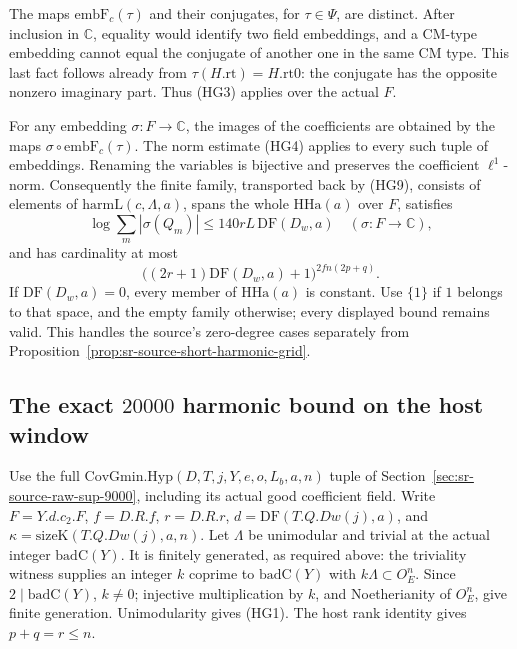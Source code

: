 The maps \(\mathrm{embF}_c(\tau)\) and their conjugates,
for \(\tau\in\Psi\), are distinct.
After inclusion in \(\mathbb C\), equality would
identify two field embeddings, and a CM-type
embedding cannot equal the conjugate of another
one in the same CM type.  This last fact follows
already from \(\tau(H.\mathrm{rt})=H.\mathrm{rt0}\):
the conjugate has the opposite nonzero imaginary
part.  Thus (HG3) applies over the actual \(F\).

For any embedding \(\sigma:F\to\mathbb C\),
the images of the coefficients are obtained by the
maps \(\sigma\circ\mathrm{embF}_c(\tau)\).
The norm estimate (HG4) applies to every such tuple
of embeddings.  Renaming the variables is bijective
and preserves the coefficient \(\ell^1\)-norm.
Consequently the finite family, transported back
by (HG9), consists of elements of
\(\mathrm{harmL}(c,\Lambda,a)\), spans the whole
\(\mathrm{HHa}(a)\) over \(F\), satisfies
\[
 \log\sum_m|\sigma(Q_m)|\le
          140rL\,\mathrm{DF}(D_w,a)\quad(\sigma:F\to\mathbb C),
 \tag{HG10}\label{eq:sr-source-harmL-all-embeddings}
\]
and has cardinality at most
\[
 \bigl((2r+1)\mathrm{DF}(D_w,a)+1\bigr)^{2fn(2p+q)}.
\]
If \(\mathrm{DF}(D_w,a)=0\), every member of
\(\mathrm{HHa}(a)\) is constant.
Use \(\{1\}\) if \(1\) belongs to that space, and the
empty family otherwise; every displayed bound remains
valid.  This handles the source's zero-degree cases
separately from Proposition~\ref{prop:sr-source-short-harmonic-grid}.

\subsection{The exact \(20000\) harmonic bound on the host window}
Use the full \(\mathrm{CovGmin.Hyp}(D,T,j,Y,e,o,L_b,a,n)\)
tuple of Section~\ref{sec:sr-source-raw-sup-9000},
including its actual good coefficient field.
Write \(F=Y.d.c_2.F\), \(f=D.R.f\), \(r=D.R.r\),
\(d=\mathrm{DF}(T.Q.Dw(j),a)\), and
\(\kappa=\mathrm{sizeK}(T.Q.Dw(j),a,n)\).
Let \(\Lambda\) be unimodular and trivial at the actual
integer \(\mathrm{badC}(Y)\).
It is finitely generated, as required above:
the triviality witness supplies an integer \(k\)
coprime to \(\mathrm{badC}(Y)\) with
\(k\Lambda\subset O_E^n\).
Since \(2\mid\mathrm{badC}(Y)\), \(k\ne0\);
injective multiplication by \(k\), and Noetherianity
of \(O_E^n\), give finite generation.
Unimodularity gives (HG1).
The host rank identity gives \(p+q=r\le n\).

